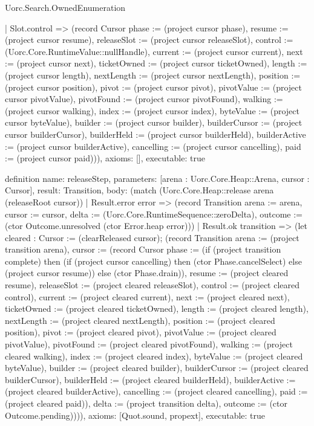 \begin{lexlean}{Uorc.Search.OwnedEnumeration}
\begin{semanticmodule}
{    | Slot.control => (record Cursor {phase := (project cursor phase), resume := (project cursor resume), releaseSlot := (project cursor releaseSlot), control := (Uorc.Core.RuntimeValue::nullHandle), current := (project cursor current), next := (project cursor next), ticketOwned := (project cursor ticketOwned), length := (project cursor length), nextLength := (project cursor nextLength), position := (project cursor position), pivot := (project cursor pivot), pivotValue := (project cursor pivotValue), pivotFound := (project cursor pivotFound), walking := (project cursor walking), index := (project cursor index), byteValue := (project cursor byteValue), builder := (project cursor builder), builderCursor := (project cursor builderCursor), builderHeld := (project cursor builderHeld), builderActive := (project cursor builderActive), cancelling := (project cursor cancelling), paid := (project cursor paid)})),
  axioms: [],
  executable: true
}

definition{
  name: releaseStep,
  parameters: [arena : Uorc.Core.Heap::Arena, cursor : Cursor],
  result: Transition,
  body: (match (Uorc.Core.Heap::release arena (releaseRoot cursor))
    | Result.error error => (record Transition {arena := arena, cursor := cursor, delta := (Uorc.Core.RuntimeSequence::zeroDelta), outcome := (ctor Outcome.unresolved (ctor Error.heap error))})
    | Result.ok transition => (let cleared : Cursor := (clearReleased cursor); (record Transition {arena := (project transition arena), cursor := (record Cursor {phase := (if (project transition complete) then (if (project cursor cancelling) then (ctor Phase.cancelSelect) else (project cursor resume)) else (ctor Phase.drain)), resume := (project cleared resume), releaseSlot := (project cleared releaseSlot), control := (project cleared control), current := (project cleared current), next := (project cleared next), ticketOwned := (project cleared ticketOwned), length := (project cleared length), nextLength := (project cleared nextLength), position := (project cleared position), pivot := (project cleared pivot), pivotValue := (project cleared pivotValue), pivotFound := (project cleared pivotFound), walking := (project cleared walking), index := (project cleared index), byteValue := (project cleared byteValue), builder := (project cleared builder), builderCursor := (project cleared builderCursor), builderHeld := (project cleared builderHeld), builderActive := (project cleared builderActive), cancelling := (project cleared cancelling), paid := (project cleared paid)}), delta := (project transition delta), outcome := (ctor Outcome.pending)}))),
  axioms: [Quot.sound, propext],
  executable: true
}


\end{semanticmodule}
\end{lexlean}
